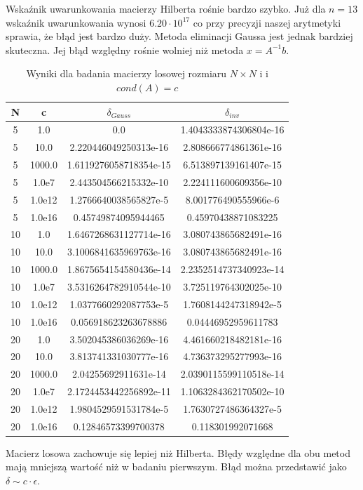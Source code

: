 \documentclass{article}
\begin{document}
Wskaźnik uwarunkowania macierzy Hilberta rośnie bardzo szybko. Już dla $n = 13$ wskaźnik uwarunkowania wynosi $6.20\cdot 10^{17}$ co przy precyzji naszej arytmetyki sprawia, że błąd jest bardzo duży. Metoda eliminacji Gaussa jest jednak bardziej skuteczna. Jej błąd względny rośnie wolniej niż metoda $x=A^{-1}b$.   


\begin{table}[H]
\centering
\begin{tabular}{|c|c|c|c|}
\hline
\textbf{N} & \textbf{c} & $\delta_{Gauss}$  & $\delta_{inv}$  \\
\hline
5 & 1.0 & 0.0 & 1.4043333874306804e-16 \\
5 & 10.0 & 2.220446049250313e-16 & 2.808666774861361e-16 \\
5 & 1000.0 & 1.6119276058718354e-15 & 6.513897139161407e-15 \\
5 & 1.0e7 & 2.443504566215332e-10 & 2.224111600609356e-10 \\
5 & 1.0e12 & 1.2766640038565827e-5 & 8.001776490555966e-6 \\
5 & 1.0e16 & 0.45749874095944465 & 0.45970438871083225 \\
10 & 1.0 & 1.6467268631127714e-16 & 3.080743865682491e-16 \\
10 & 10.0 & 3.1006841635969763e-16 & 3.080743865682491e-16 \\
10 & 1000.0 & 1.8675654154580436e-14 & 2.2352514737340923e-14 \\
10 & 1.0e7 & 3.5316264782910544e-10 & 3.725119764302025e-10 \\
10 & 1.0e12 & 1.0377660292087753e-5 & 1.7608144247318942e-5 \\
10 & 1.0e16 & 0.056918623263678886 & 0.04446952959611783 \\
20 & 1.0 & 3.502045386036269e-16 & 4.461660218482181e-16 \\
20 & 10.0 & 3.813741331030777e-16 & 4.736373295277993e-16 \\
20 & 1000.0 & 2.04255692911631e-14 & 2.0390115599110518e-14 \\
20 & 1.0e7 & 2.1724453442256892e-11 & 1.1063284362170502e-10 \\
20 & 1.0e12 & 1.9804529591531784e-5 & 1.7630727486364327e-5 \\
20 & 1.0e16 & 0.12846573399700378 & 0.118301992071668 \\
\hline
\end{tabular}
\caption{Wyniki dla badania macierzy losowej rozmiaru $N \times N$ i i $cond(A)=c$}
\label{tab:dataset}
\end{table}
Macierz losowa zachowuje się lepiej niż Hilberta. Błędy względne dla obu metod mają mniejszą wartość niż w badaniu pierwszym. Błąd można przedstawić jako $\delta \sim c \cdot \epsilon$.
\end{document}
